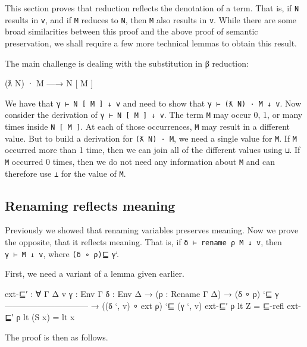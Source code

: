 This section proves that reduction reflects the denotation of a term.
That is, if \texttt{N} results in \texttt{v}, and if \texttt{M} reduces
to \texttt{N}, then \texttt{M} also results in \texttt{v}. While there
are some broad similarities between this proof and the above proof of
semantic preservation, we shall require a few more technical lemmas to
obtain this result.

The main challenge is dealing with the substitution in β reduction:

\begin{myDisplay}
(ƛ N) · M —→ N [ M ]
\end{myDisplay}

We have that \texttt{γ\ ⊢\ N\ {[}\ M\ {]}\ ↓\ v} and need to show that
\texttt{γ\ ⊢\ (ƛ\ N)\ ·\ M\ ↓\ v}. Now consider the derivation of
\texttt{γ\ ⊢\ N\ {[}\ M\ {]}\ ↓\ v}. The term \texttt{M} may occur 0, 1,
or many times inside \texttt{N\ {[}\ M\ {]}}. At each of those
occurrences, \texttt{M} may result in a different value. But to build a
derivation for \texttt{(ƛ\ N)\ ·\ M}, we need a single value for
\texttt{M}. If \texttt{M} occurred more than 1 time, then we can join
all of the different values using \texttt{⊔}. If \texttt{M} occurred 0
times, then we do not need any information about \texttt{M} and can
therefore use \texttt{⊥} for the value of \texttt{M}.

\hypertarget{renaming-reflects-meaning}{%
\subsection{Renaming reflects meaning}\label{renaming-reflects-meaning}}

Previously we showed that renaming variables preserves meaning. Now we
prove the opposite, that it reflects meaning. That is, if
\texttt{δ\ ⊢\ rename\ ρ\ M\ ↓\ v}, then \texttt{γ\ ⊢\ M\ ↓\ v}, where
\texttt{(δ\ ∘\ ρ)}⊑ γ`.

First, we need a variant of a lemma given earlier.

\begin{fence}
\begin{code}
ext-⊑′ : ∀ {Γ Δ v} {γ : Env Γ} {δ : Env Δ}
  → (ρ : Rename Γ Δ)
  → (δ ∘ ρ) `⊑ γ
    ------------------------------
  → ((δ `, v) ∘ ext ρ) `⊑ (γ `, v)
ext-⊑′ ρ lt Z = ⊑-refl
ext-⊑′ ρ lt (S x) = lt x
\end{code}
\end{fence}

The proof is then as follows.

